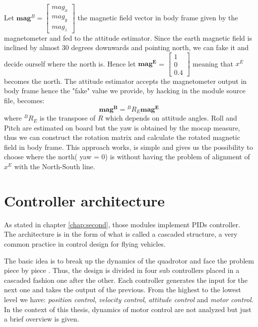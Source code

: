 \noindent
Let $\boldsymbol{mag}^B = \begin{bmatrix}mag_x\\mag_y\\mag_z\end{bmatrix}$ the magnetic field vector in body frame given by the magnetometer and fed to the attitude estimator. Since the earth magnetic field is inclined by almost 30 degrees downwards and pointing north, we can fake it and decide ourself where the north is. Hence let $\boldsymbol{mag^E}$ = $\begin{bmatrix}1\\0\\0.4\end{bmatrix}$ meaning that $x^E$ becomes the north. The attitude estimator accepts the magnetometer output in body frame hence the "fake" value we provide, by hacking in the module source file, becomes:
\begin{equation}
	 \boldsymbol{mag^B} = {}^BR_E \boldsymbol{mag^E}
\end{equation}
where  ${}^BR_E$ is the transpose of $R$ which depends on attitude angles. Roll and Pitch are estimated on board but the yaw is obtained by the mocap measure, thus we can construct the rotation matrix and calculate the rotated magnetic field in body frame. This approach works, is simple and gives us the possibility to choose where the north( yaw = 0) is without having the problem of alignment of $x^E$ with the North-South line.

\section{Controller architecture}

As stated in chapter \ref{chap:second}, those modules implement PIDs controller. The architecture is in the form of what is called a cascaded structure, a very common practice in control design for flying vehicles. 

The basic idea is to break up the dynamics of the quadrotor and face the problem piece by piece \cite{Mellinger2012}. Thus, the design is divided in four sub controllers placed in a cascaded fashion one after the other. Each controller generates the input for the next one and takes the output of the previous. From the highest to the lowest level we have:\textit{ position control}, \textit{velocity control}, \textit{attitude control} and\textit{ motor control}. In the context of this thesis, dynamics of motor control are not analyzed but just a brief overview is given. 

